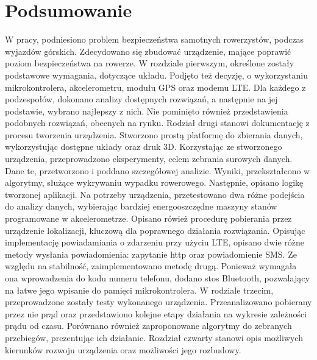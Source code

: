 \chapter{Podsumowanie}
W pracy, podniesiono problem bezpieczeństwa samotnych rowerzystów, podczas wyjazdów górskich. Zdecydowano się zbudować urządzenie, mające poprawić poziom bezpieczeństwa na rowerze. W rozdziale pierwszym, określone zostały podstawowe wymagania, dotyczące układu. Podjęto też decyzję, o wykorzystaniu mikrokontrolera, akcelerometru, modułu GPS oraz modemu LTE. Dla każdego z podzespołów, dokonano analizy dostępnych rozwiązań, a następnie na jej podstawie, wybrano najlepszy z nich. Nie pominięto również przedstawienia podobnych rozwiązań, obecnych na rynku. Rodział drugi stanowi dokumentację z procesu tworzenia urządzenia. Stworzono prostą platformę do zbierania danych, wykorzystując dostępne układy oraz druk 3D. Korzystając ze stworzonego urządzenia, przeprowadzono eksperymenty, celem zebrania surowych danych. Dane te, przetworzono i poddano szczegółowej analizie. Wyniki, przekształcono w algorytmy, służące wykrywaniu wypadku rowerowego. Następnie, opisano logikę tworzonej aplikacji. Na potrzeby urządzenia, przetestowano dwa różne podejścia do analizy danych, wybierając bardziej energooszczędne maszyny stanów programowane w akcelerometrze. Opisano rówież procedurę pobierania przez urządzenie lokalizacji, kluczową dla poprawnego działania rozwiązania. Opisując implementację powiadamiania o zdarzeniu przy użyciu LTE, opisano dwie różne metody wysłania powiadomienia: zapytanie http oraz powiadomienie SMS. Ze względu na stabilność, zaimplementowano metodę drugą. Ponieważ wymagała ona wprowadzenia do kodu numeru telefonu, dodano stos Bluetooth, pozwalający na łatwe jego wpisanie do pamięci mikrokontrolera. W rodziale trzecim, przeprowadzone zostały testy wykonanego urządzenia. Przeanalizowano pobierany przez nie prąd oraz przedstawiono kolejne etapy działania na wykresie zależności prądu od czasu. Porównano również zaproponowane algorytmy do zebranych przebiegów, prezentując ich działanie. Rozdział czwarty stanowi opis możliwych kierunków rozwoju urządzenia oraz możliwości jego rozbudowy.
